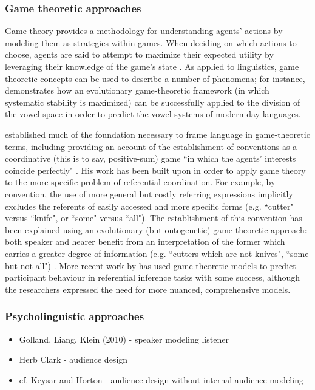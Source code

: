 \documentclass[12pt,a4paper]{article}
\begin{document}
\subsubsection{Game theoretic approaches}
Game theory provides a methodology for understanding agents' actions by modeling them as strategies within games. When deciding on which actions to choose, agents are said to attempt to maximize their expected utility by leveraging their knowledge of the game's state \citep{benz2005}. As applied to linguistics, game theoretic concepts can be used to describe a number of phenomena; for instance, \cite{jaeger2008} demonstrates how an evolutionary game-theoretic framework (in which systematic stability is maximized) can be successfully applied to the division of the vowel space in order to predict the vowel systems of modern-day languages.

\cite{lewis1969} established much of the foundation necessary to frame language in game-theoretic terms, including providing an account of the establishment of conventions as a coordinative (this is to say, positive-sum) game ``in which the agents' interests coincide perfectly" \citep[p.~14]{lewis1969}.
His work has been built upon in order to apply game theory to the more specific problem of referential coordination. For example, by convention, the use of more general but costly referring expressions implicitly excludes the referents of easily accessed and more specific forms (e.g. ``cutter" versus ``knife", or ``some" versus ``all"). The establishment of this convention has been explained using an evolutionary (but ontogenetic) game-theoretic approach: both speaker and hearer benefit from an interpretation of the former which carries a greater degree of information (e.g. ``cutters which are not knives", ``some but not all") \citep{benz2005}. More recent work by \cite{degen2012} has used game theoretic models to predict participant behaviour in referential inference tasks with some success, although the researchers expressed the need for more nuanced, comprehensive models. 

\subsubsection{Psycholinguistic approaches}
\begin{itemize}
\item Golland, Liang, Klein (2010) - speaker modeling listener
\item Herb Clark - audience design
\item cf. Keysar and Horton - audience design without internal audience modeling
\end{itemize}
\end{document}
